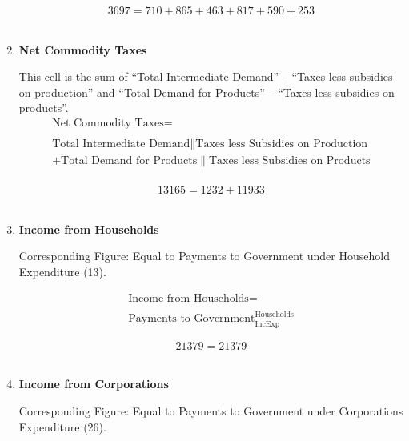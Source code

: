 \begin{enumerate}
\begin{equation} \nonumber
3697 = 710+865+463+817+590+253
\end{equation}\\


\item \textbf {Net Commodity Taxes}

This cell is the sum of “Total Intermediate Demand” – “Taxes less subsidies on production” and “Total Demand for Products” – “Taxes less subsidies on products”. \cite{ScotGov2013a}\\

\begin{equation}
\begin{split}
\text{Net Commodity Taxes} =  \\ \\
\text{Total Intermediate Demand}\|\text{Taxes less Subsidies on Production}\\
+\text{Total Demand for Products}\|\text{Taxes less Subsidies on Products}\\
\end{split} \label{eq:2.5.36}
\end{equation}

\begin{equation} \nonumber
13165 = 1232+11933
\end{equation}\\


\item \textbf {Income from Households}

Corresponding Figure: Equal to Payments to Government under Household Expenditure (13).

\begin{equation}
\begin{split}
\text{Income from Households} =  \\ \\
\text{Payments to Government}^\text{Households}_\text{IncExp}
\end{split} \label{eq:2.5.37}
\end{equation}

\begin{equation} \nonumber
21379 = 21379
\end{equation}\\


\item \textbf {Income from Corporations}

Corresponding Figure: Equal to Payments to Government under Corporations Expenditure (26).


\end{enumerate}
